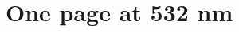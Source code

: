 \documentclass[10pt,a4paper]{article}
\begin{document}
\section*{One page at 532 nm}
\lipsum[1-4]
\limenrule
\lipsum[5-6]
\end{document}
